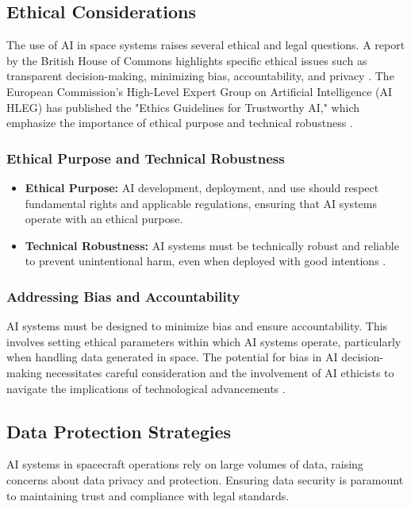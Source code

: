 \documentclass[a4paper, 11pt]{article}
\begin{document}
\subsection{Ethical Considerations}

The use of AI in space systems raises several ethical and legal questions. A report by the British House of Commons highlights specific ethical issues such as transparent decision-making, minimizing bias, accountability, and privacy \cite{british_report_325}. The European Commission's High-Level Expert Group on Artificial Intelligence (AI HLEG) has published the "Ethics Guidelines for Trustworthy AI," which emphasize the importance of ethical purpose and technical robustness \cite{ai_hleg_344}.

\subsubsection{Ethical Purpose and Technical Robustness}

\begin{itemize}
    \item \textbf{Ethical Purpose:} AI development, deployment, and use should respect fundamental rights and applicable regulations, ensuring that AI systems operate with an ethical purpose.
    \item \textbf{Technical Robustness:} AI systems must be technically robust and reliable to prevent unintentional harm, even when deployed with good intentions \cite{ai_hleg_344}.
\end{itemize}

\subsubsection{Addressing Bias and Accountability}

AI systems must be designed to minimize bias and ensure accountability. This involves setting ethical parameters within which AI systems operate, particularly when handling data generated in space. The potential for bias in AI decision-making necessitates careful consideration and the involvement of AI ethicists to navigate the implications of technological advancements \cite{pavaloiu_328}.

\subsection{Data Protection Strategies}

AI systems in spacecraft operations rely on large volumes of data, raising concerns about data privacy and protection. Ensuring data security is paramount to maintaining trust and compliance with legal standards.
\end{document}
